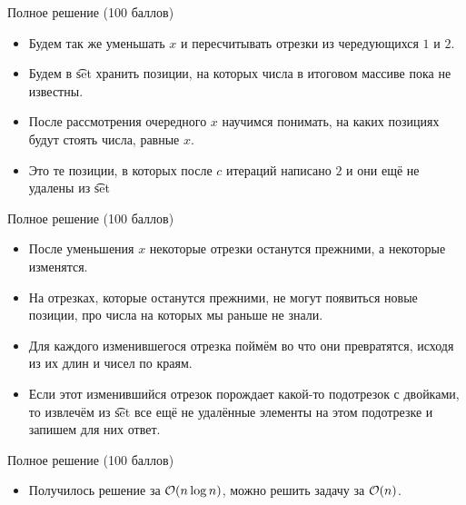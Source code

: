 \begin{frame}{Полное решение (100 баллов)}
  \begin{itemize}
  \item Будем так же уменьшать $x$ и пересчитывать отрезки из чередующихся $1$ и $2$.
  \item Будем в \t{set} хранить позиции, на которых числа в итоговом массиве пока не известны.
  \item После рассмотрения очередного $x$ научимся понимать, на каких позициях будут стоять числа, равные $x$.
  \item Это те позиции, в которых после $c$ итераций написано $2$ и они ещё не удалены из \t{set}
  \end{itemize}
\end{frame}


\begin{frame}{Полное решение (100 баллов)}
  \begin{itemize}
  \item После уменьшения $x$ некоторые отрезки останутся прежними, а некоторые изменятся.
  \item На отрезках, которые останутся прежними, не могут появиться новые позиции, про числа на которых мы раньше не знали.
  \item Для каждого изменившегося отрезка поймём во что они превратятся, исходя из их длин и чисел по краям.
  \item Если этот изменившийся отрезок порождает какой-то подотрезок с двойками, то извлечём из \t{set} все ещё не удалённые элементы на этом подотрезке и запишем для них ответ.
  \end{itemize}
\end{frame}

\begin{frame}{Полное решение (100 баллов)}
  \begin{itemize}
  \item Получилось решение за $\mathcal{O}(n \log n)$, можно решить задачу за $\mathcal{O}(n)$.
  \end{itemize}
\end{frame}


